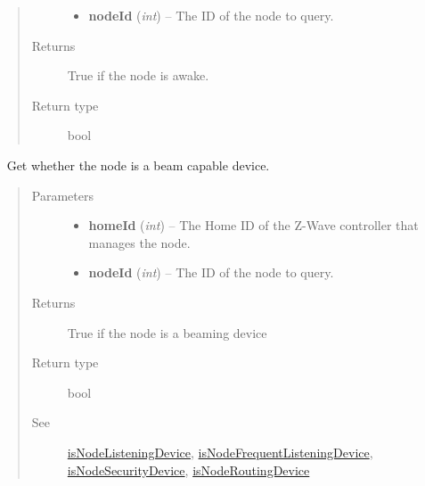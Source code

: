 \documentclass[letterpaper,10pt,english]{sphinxmanual}
\begin{document}
\begin{fulllineitems}
\begin{fulllineitems}
\begin{quote}
\begin{description}
\begin{itemize}
\item {} 
\textbf{nodeId} (\emph{int}) -- The ID of the node to query.

\end{itemize}

\item[{Returns}] \leavevmode
True if the node is awake.

\item[{Return type}] \leavevmode
bool

\end{description}\end{quote}

\end{fulllineitems}


\begin{fulllineitems}
\label{libopenzwave:libopenzwave.PyManager.isNodeBeamingDevice}~\label{libopenzwave:isnodebeamingdevice}
Get whether the node is a beam capable device.
\begin{quote}\begin{description}
\item[{Parameters}] \leavevmode\begin{itemize}
\item {} 
\textbf{homeId} (\emph{int}) -- The Home ID of the Z-Wave controller that manages the node.

\item {} 
\textbf{nodeId} (\emph{int}) -- The ID of the node to query.

\end{itemize}

\item[{Returns}] \leavevmode
True if the node is a beaming device

\item[{Return type}] \leavevmode
bool

\item[{See}] \leavevmode
{\hyperref[libopenzwave:isnodelisteningdevice]{isNodeListeningDevice}}, {\hyperref[libopenzwave:isnodefrequentlisteningdevice]{isNodeFrequentListeningDevice}}, {\hyperref[libopenzwave:isnodesecuritydevice]{isNodeSecurityDevice}}, {\hyperref[libopenzwave:isnoderoutingdevice]{isNodeRoutingDevice}}

\end{description}\end{quote}


\end{fulllineitems}
\end{fulllineitems}
\end{document}
